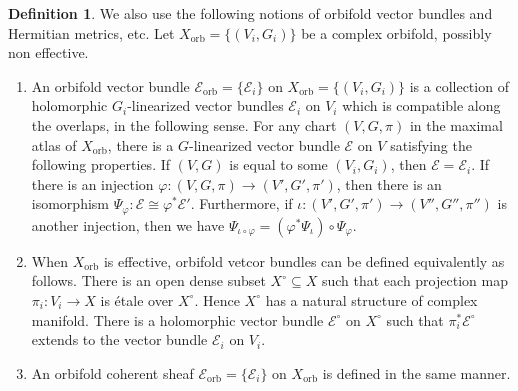 \documentclass[12pt]{amsart}
\newcommand{\<}{\leq}
\def\mcE{\mathcal{E}}
\theoremstyle{remark}
\theoremstyle{definition}
\newtheorem{definition}[theorem]{Definition}
\theoremstyle{definition}
\numberwithin{equation}{section}
\theoremstyle{definition}
\theoremstyle{definition}
\def\orb{\mathrm{orb}}
\begin{document}
 


 




\begin{definition}\label{def:orb-vector-bundle}
We also use the following notions of orbifold vector bundles and Hermitian metrics, etc. 
Let  $X_{\orb}=\{(V_i, G_i)\}$ be a complex  orbifold, possibly non effective.
    \begin{enumerate}
        \item An orbifold vector bundle $\mcE_{\orb} = \{\mcE_i\}$ on $X_{\orb}=\{(V_i, G_i)\}$  is a collection of holomorphic $G_i$-linearized vector bundles $ \mcE_i $ on $V_i$  which is compatible along the overlaps, in the following sense.   
        For any chart $(V,G,\pi)$ in the maximal atlas of $X_{\orb}$,  there is a $G$-linearized vector bundle $\mcE$ on $V$ satisfying the following properties.  
        If $(V,G)$ is equal to some $(V_i,G_i)$, then $\mcE = \mcE_i$. 
        If there is an injection $\varphi  \colon (V,G,\pi) \to (V',G',\pi')$, then there is an isomorphism $\Psi_{\varphi} \colon \mcE \cong  \varphi^*\mcE' $. 
        Furthermore, if $\iota \colon (V',G',\pi') \to (V'',G'',\pi'')$ is another injection, then we have $\Psi_{\iota \circ \varphi} = (\varphi^*\Psi_{\iota}) \circ \Psi_{\varphi}$. 




        \item When $X_{\orb}$ is effective, orbifold vetcor bundles can be defined  equivalently as follows.   
        There is an open dense subset $X^\circ \subseteq X$ such that each projection map $\pi_i\colon V_i \to X$ is \'etale over $X^\circ$. Hence $X^\circ$ has a natural structure of complex manifold. There is a holomorphic vector bundle $\mcE^\circ$ on $X^\circ$ such that  $\pi_i^*\mcE^\circ$ extends to the vector bundle $\mcE_i$ on $V_i$.

        \item An orbifold coherent sheaf $\mcE_{\orb}=\{\mcE_i\}$ on $X_{\orb}$ is defined in the same manner.


\end{enumerate}
\end{definition}
\end{document}
